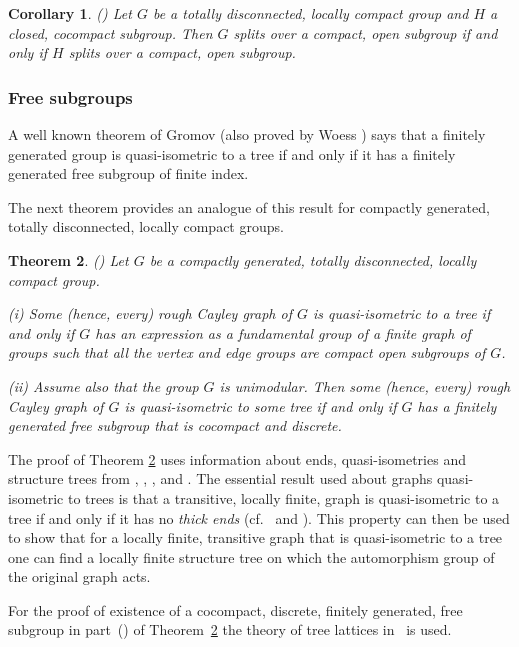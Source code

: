 \documentclass{emsprocart}
\newtheorem{theorem}{Theorem}[section]
\newtheorem{corollary}[theorem]{Corollary}
\theoremstyle{definition}
\begin{document}
\begin{corollary}{\rm (\cite[Corollary~3.22]{KronMoller2008})}
Let $G$ be a totally disconnected, locally compact group and $H$ a
closed, cocompact subgroup.  Then $G$ splits over a compact, open
subgroup if and only if $H$ splits over a compact, open subgroup.
\end{corollary}

\subsubsection{Free subgroups}
A well known theorem of Gromov (also proved by Woess
\cite{Woess1989a}) says that a finitely generated group is
quasi-isometric to a tree if and only if it has a finitely generated
free subgroup of finite index.

The next theorem provides an analogue of this result for
compactly generated, totally disconnected, locally compact groups.

 \begin{theorem}{\rm (\cite[Theorem~3.28]{KronMoller2008})}
\label{TQuasiTree}
 Let $G$ be a compactly generated, totally disconnected,
  locally compact group.

(i)
Some (hence, every) rough Cayley graph of $G$ is
quasi-isometric to a tree if and only if $G$ has an expression as a
fundamental group of a finite graph of groups such that all the vertex and edge
groups are compact open subgroups of $G$.

(ii)
Assume also that the group $G$ is unimodular.  Then
some (hence, every) rough Cayley graph of $G$ is
quasi-isometric to some tree if and only if $G$ has a finitely
generated free subgroup that is cocompact and discrete.
\end{theorem}

The proof of Theorem \ref{TQuasiTree} uses information about ends,
quasi-isometries and structure trees from \cite{Woess1989a}, \cite{Kron2001a},
\cite{KronMoller2008a}, \cite{Moller1992a} and
\cite{ThomassenWoess1993}.  The essential result used about graphs
quasi-isometric to trees is that a transitive, locally finite, graph is
quasi-isometric to a tree if and only if it has no {\em thick ends}
(cf.~\cite{Woess1989a} and \cite[Theorem~5.5]{KronMoller2008a}).  This property can then be
used to show that for a
locally finite, transitive graph that is quasi-isometric to a tree
one can find a locally finite structure tree on which the automorphism
group of the original graph acts.

For the proof of existence of a cocompact, discrete, finitely
generated, free subgroup in part~() of
Theorem~\ref{TQuasiTree} the theory of tree lattices in~\cite{BassKulkarni1990} is used.
\end{document}
